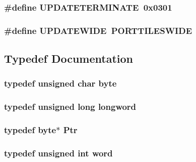 \label{ID__HEADS_8H_ad2cc891daa548d3c1c773338e4337edc}
\hypertarget{ID__HEADS_8H_a797d7a97620edcdf1bdaf82dc77231b2}{
\subsubsection[{UPDATETERMINATE}]{\setlength{\rightskip}{0pt plus 5cm}\#define UPDATETERMINATE~0x0301}}
\label{ID__HEADS_8H_a797d7a97620edcdf1bdaf82dc77231b2}
\hypertarget{ID__HEADS_8H_a40cd9d9262b9ea0fbcd5b793e69331e6}{
\subsubsection[{UPDATEWIDE}]{\setlength{\rightskip}{0pt plus 5cm}\#define UPDATEWIDE~PORTTILESWIDE}}
\label{ID__HEADS_8H_a40cd9d9262b9ea0fbcd5b793e69331e6}


\subsection{Typedef Documentation}
\hypertarget{ID__HEADS_8H_a0c8186d9b9b7880309c27230bbb5e69d}{
\subsubsection[{byte}]{\setlength{\rightskip}{0pt plus 5cm}typedef unsigned char {\bf byte}}}
\label{ID__HEADS_8H_a0c8186d9b9b7880309c27230bbb5e69d}
\hypertarget{ID__HEADS_8H_a8a9a7dd50c6fdb45dcdf0eb929479663}{
\subsubsection[{longword}]{\setlength{\rightskip}{0pt plus 5cm}typedef unsigned long {\bf longword}}}
\label{ID__HEADS_8H_a8a9a7dd50c6fdb45dcdf0eb929479663}
\hypertarget{ID__HEADS_8H_a12c6a4af9f1e5c1a48e22de17a94ed1b}{
\subsubsection[{Ptr}]{\setlength{\rightskip}{0pt plus 5cm}typedef {\bf byte}$\ast$ {\bf Ptr}}}
\label{ID__HEADS_8H_a12c6a4af9f1e5c1a48e22de17a94ed1b}
\hypertarget{ID__HEADS_8H_abad51e07ab6d26bec9f1f786c8d65bcd}{
\subsubsection[{word}]{\setlength{\rightskip}{0pt plus 5cm}typedef unsigned int {\bf word}}}
\label{ID__HEADS_8H_abad51e07ab6d26bec9f1f786c8d65bcd}



